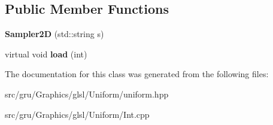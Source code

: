\subsection*{\-Public \-Member \-Functions}
\begin{DoxyCompactItemize}
\item 
\hypertarget{classglutpp_1_1glsl_1_1Uniform_1_1Scalar_1_1Sampler2D_aa1a2929f92bd83cfa599b0e7393fccb3}{{\bfseries \-Sampler2\-D} (std\-::string s)}\label{classglutpp_1_1glsl_1_1Uniform_1_1Scalar_1_1Sampler2D_aa1a2929f92bd83cfa599b0e7393fccb3}

\item 
\hypertarget{classglutpp_1_1glsl_1_1Uniform_1_1Scalar_1_1Sampler2D_aa6042d85202d728e4ef81989f5034979}{virtual void {\bfseries load} (int)}\label{classglutpp_1_1glsl_1_1Uniform_1_1Scalar_1_1Sampler2D_aa6042d85202d728e4ef81989f5034979}

\end{DoxyCompactItemize}


\-The documentation for this class was generated from the following files\-:\begin{DoxyCompactItemize}
\item 
src/gru/\-Graphics/glsl/\-Uniform/uniform.\-hpp\item 
src/gru/\-Graphics/glsl/\-Uniform/\-Int.\-cpp\end{DoxyCompactItemize}

